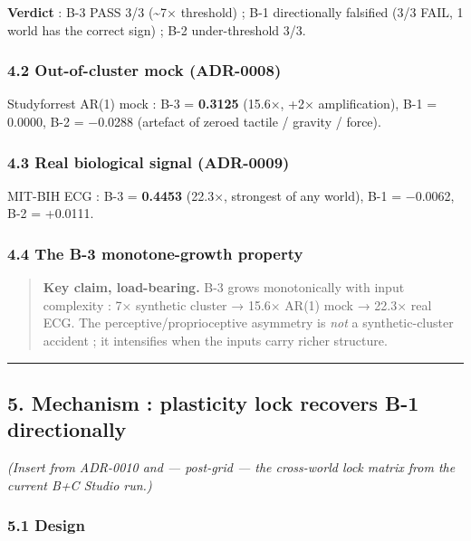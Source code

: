 \documentclass[
]{article}
\begin{document}
\textbf{Verdict} : B-3 PASS 3/3 (\textasciitilde7× threshold) ; B-1
directionally falsified (3/3 FAIL, 1 world has the correct sign) ; B-2
under-threshold 3/3.

\subsubsection{4.2 Out-of-cluster mock
(ADR-0008)}\label{42-out-of-cluster-mock-adr-0008}

Studyforrest AR(1) mock : B-3 = \textbf{0.3125} (15.6×, +2×
amplification), B-1 = 0.0000, B-2 = −0.0288 (artefact of zeroed tactile
/ gravity / force).

\subsubsection{4.3 Real biological signal
(ADR-0009)}\label{43-real-biological-signal-adr-0009}

MIT-BIH ECG : B-3 = \textbf{0.4453} (22.3×, strongest of any world), B-1
= −0.0062, B-2 = +0.0111.

\subsubsection{4.4 The B-3 monotone-growth
property}\label{44-the-b-3-monotone-growth-property}

\begin{quote}
\textbf{Key claim, load-bearing.} B-3 grows monotonically with input
complexity : 7× synthetic cluster → 15.6× AR(1) mock → 22.3× real ECG.
The perceptive/proprioceptive asymmetry is \emph{not} a
synthetic-cluster accident ; it intensifies when the inputs carry richer
structure.
\end{quote}

\begin{center}\rule{0.5\linewidth}{0.5pt}\end{center}

\subsection{5. Mechanism : plasticity lock recovers B-1
directionally}\label{5-mechanism--plasticity-lock-recovers-b-1-directionally}

\emph{(Insert from ADR-0010 and --- post-grid --- the cross-world lock
matrix from the current B+C Studio run.)}

\subsubsection{5.1 Design}\label{51-design}
\end{document}
